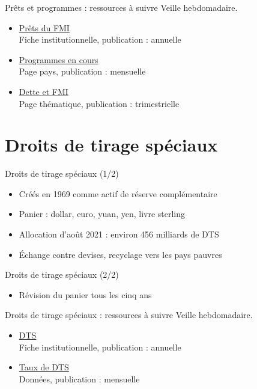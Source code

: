 \documentclass[aspectratio=169,11pt]{beamer}
\begin{document}
\begin{frame}{Prêts et programmes : ressources à suivre}
\small
Veille hebdomadaire.
\begin{itemize}
\item \href{https://www.imf.org/en/About/Factsheets/Sheets/2023/IMF-Lending}{Prêts du FMI}\\{\footnotesize Fiche institutionnelle, publication : annuelle}
\item \href{https://www.imf.org/en/Countries/ResRep}{Programmes en cours}\\{\footnotesize Page pays, publication : mensuelle}
\item \href{https://www.imf.org/en/Topics/imf-and-debt}{Dette et FMI}\\{\footnotesize Page thématique, publication : trimestrielle}
\end{itemize}
\end{frame}

\section{Droits de tirage spéciaux}
\begin{frame}{Droits de tirage spéciaux (1/2)}
\begin{itemize}
\item Créés en 1969 comme actif de réserve complémentaire
\item Panier : dollar, euro, yuan, yen, livre sterling
\item Allocation d'août 2021 : environ 456 milliards de DTS
\item Échange contre devises, recyclage vers les pays pauvres
\end{itemize}
\end{frame}

\begin{frame}{Droits de tirage spéciaux (2/2)}
\begin{itemize}
\item Révision du panier tous les cinq ans
\end{itemize}
\end{frame}

\begin{frame}{Droits de tirage spéciaux : ressources à suivre}
\small
Veille hebdomadaire.
\begin{itemize}
\item \href{https://www.imf.org/en/About/Factsheets/Sheets/2023/special-drawing-rights-sdr}{DTS}\\{\footnotesize Fiche institutionnelle, publication : annuelle}
\item \href{https://www.imf.org/external/np/fin/data/rms_sdrv.aspx}{Taux de DTS}\\{\footnotesize Données, publication : mensuelle}
\end{itemize}
\end{frame}
\end{document}
